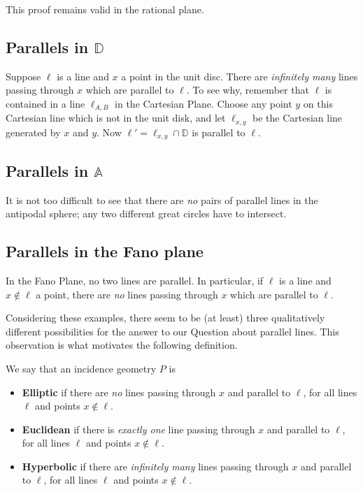 This proof remains valid in the rational plane.


\subsection{Parallels in \(\mathbb{D}\)}

Suppose \(\ell\) is a line and \(x\) a point in the unit disc.
There are \emph{infinitely many} lines passing through \(x\) which are parallel to \(\ell\).
To see why, remember that \(\ell\) is contained in a line \(\ell_{A,B}\) in the Cartesian Plane.
Choose any point \(y\) on this Cartesian line which is not in the unit disk, and let \(\ell_{x,y}\) be the Cartesian line generated by \(x\) and \(y\).
Now \(\ell' = \ell_{x,y} \cap \mathbb{D}\) is parallel to \(\ell\).



\subsection{Parallels in \(\mathbb{A}\)}

It is not too difficult to see that there are \emph{no} pairs of parallel lines in the antipodal sphere; any two different great circles have to intersect.




\subsection{Parallels in the Fano plane}

In the Fano Plane, no two lines are parallel.
In particular, if \(\ell\) is a line and \(x \notin \ell\) a point, there are \emph{no} lines passing through \(x\) which are parallel to \(\ell\).



Considering these examples, there seem to be (at least) three qualitatively different possibilities for the answer to our Question about parallel lines.
This observation is what motivates the following definition.

\begin{dfn}
We say that an incidence geometry \(P\) is
\begin{itemize}
\item \textbf{Elliptic} if there are \emph{no} lines passing through \(x\) and parallel to \(\ell\), for all lines \(\ell\) and points \(x \notin \ell\).
\item \textbf{Euclidean} if there is \emph{exactly one} line passing through \(x\) and parallel to \(\ell\), for all lines \(\ell\) and points \(x \notin \ell\).
\item \textbf{Hyperbolic} if there are \emph{infinitely many} lines passing through \(x\) and parallel to \(\ell\), for all lines \(\ell\) and points \(x \notin \ell\).
\end{itemize}
\end{dfn}

